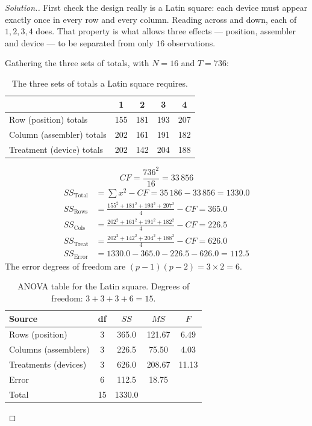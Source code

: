 \documentclass[11pt,a4paper]{article}
\theoremstyle{definition}
\newenvironment{solution}
  {\renewcommand{\qedsymbol}{}\begin{proof}[\textit{Solution}.]}
  {\end{proof}}
\begin{document}
\begin{solution}
First check the design really is a Latin square: each device must appear exactly once in
every row and every column. Reading across and down, each of $1,2,3,4$ does. That property
is what allows three effects --- position, assembler and device --- to be separated from only
$16$ observations.

Gathering the three sets of totals, with $N=16$ and $T=736$:
\begin{table}[H]
\centering
\begin{tabular}{|l|c|c|c|c|}
\hline
 & 1 & 2 & 3 & 4\\
\hline
Row (position) totals & 155 & 181 & 193 & 207\\
Column (assembler) totals & 202 & 161 & 191 & 182\\
Treatment (device) totals & 202 & 142 & 204 & 188\\
\hline
\end{tabular}
\caption{The three sets of totals a Latin square requires.}
\end{table}

\[CF=\frac{736^2}{16}=33\,856\]
\begin{align*}
SS_{\text{Total}} &=\sum x^2-CF=35\,186-33\,856=1330.0\\
SS_{\text{Rows}} &=\frac{155^2+181^2+193^2+207^2}{4}-CF=365.0\\
SS_{\text{Cols}} &=\frac{202^2+161^2+191^2+182^2}{4}-CF=226.5\\
SS_{\text{Treat}} &=\frac{202^2+142^2+204^2+188^2}{4}-CF=626.0\\
SS_{\text{Error}} &=1330.0-365.0-226.5-626.0=112.5
\end{align*}
The error degrees of freedom are $(p-1)(p-2)=3\times 2=6$.

\begin{table}[H]
\centering
\begin{tabular}{|l|c|c|c|c|}
\hline
Source & df & $SS$ & $MS$ & $F$\\
\hline
Rows (position) & 3 & 365.0 & 121.67 & 6.49\\
Columns (assemblers) & 3 & 226.5 & 75.50 & 4.03\\
Treatments (devices) & 3 & 626.0 & 208.67 & 11.13\\
Error & 6 & 112.5 & 18.75 & \\
\hline
Total & 15 & 1330.0 & & \\
\hline
\end{tabular}
\caption{ANOVA table for the Latin square. Degrees of freedom: $3+3+3+6=15$.}
\end{table}


\end{solution}
\end{document}
